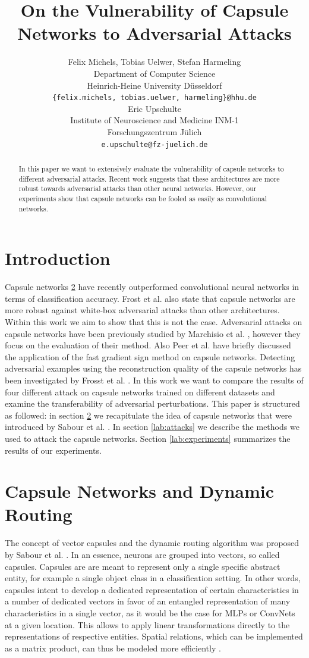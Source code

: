 \documentclass{article}
\title{On the Vulnerability of Capsule Networks to Adversarial Attacks}
\author{%
  Felix Michels, Tobias Uelwer, Stefan Harmeling \\
  Department of Computer Science\\
  Heinrich-Heine University Düsseldorf\\
  \texttt{\{felix.michels, tobias.uelwer, harmeling\}@hhu.de} \\
  \And
  Eric Upschulte \\
  Institute of Neuroscience and Medicine INM-1\\
  Forschungszentrum Jülich \\
  \texttt{e.upschulte@fz-juelich.de} \\
}
\begin{document}
\maketitle

\begin{abstract}
	In this paper we want to extensively evaluate the vulnerability of capsule networks to different adversarial attacks. Recent work suggests that these architectures are more robust towards adversarial attacks than other neural networks. However, our experiments show that capsule networks can be fooled as easily as convolutional networks.

\end{abstract}

\section{Introduction}
Capsule networks \ref{lab:capsules} have recently outperformed convolutional neural networks in terms of classification accuracy. Frost et al. \cite{darccc} also state that capsule networks are more robust against white-box adversarial attacks than other architectures. Within this work we aim to show that this is not the case. Adversarial attacks on capsule networks have been previously studied by Marchisio et al. \cite{marchisio}, however they focus on the evaluation of their method. Also Peer et al. \cite{training} have briefly discussed the application of the fast gradient sign method \cite{fgsm} on capsule networks. Detecting adversarial examples using the reconstruction quality of the capsule networks has been investigated by Frosst et al. \cite{darccc}. In this work we want to compare the results of four different attack on capsule networks trained on different datasets and examine the transferability of adversarial perturbations. This paper is structured as followed: in section \ref{lab:capsules} we recapitulate the idea of capsule networks that were introduced by Sabour et al. \cite{capsules}. In section \ref{lab:attacks} we describe the methods we used to attack the capsule networks. Section \ref{lab:experiments} summarizes the results of our experiments.

\section{Capsule Networks and Dynamic Routing}
\label{lab:capsules}
The concept of vector capsules and the dynamic routing algorithm was proposed by Sabour et al. \cite{capsules}. In an essence, neurons are grouped into vectors, so called capsules. Capsules are are meant to represent only a single specific abstract entity, for example a single object class in a classification setting.
In other words, capsules intent to develop a dedicated representation of certain characteristics in a number of dedicated vectors in favor of an entangled representation of many characteristics in a single vector, as it would be the case for MLPs or ConvNets at a given location. This allows to apply linear transformations directly to the representations of respective entities. Spatial relations, which can be implemented as a matrix product, can thus be modeled more efficiently \cite{capsules}.
\end{document}
